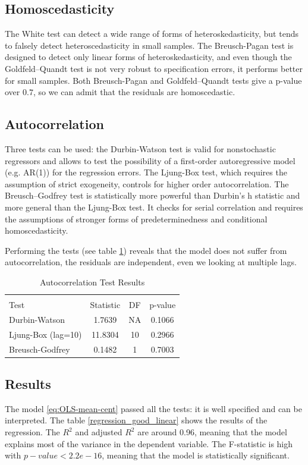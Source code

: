 \subsection{Homoscedasticity}
The White test can detect a wide range of forms of heteroskedasticity, but tends to falsely detect heteroscedasticity in small samples. The {Breusch-Pagan} test is designed to detect only linear forms of heteroskedasticity, and even though the Goldfeld–Quandt test is not very robust to specification errors, it performs better for small samples. Both Breusch-Pagan and Goldfeld–Quandt tests give a p-value over $0.7$, so we can admit that the residuals are homoscedastic.

\subsection{Autocorrelation}
Three tests can be used: the Durbin-Watson test is valid for nonstochastic regressors and allows to test the possibility of a first-order autoregressive model (e.g. AR(1)) for the regression errors. The Ljung-Box test, which requires the assumption of strict exogeneity, controls for higher order autocorrelation. 
The Breusch–Godfrey test is statistically more powerful than Durbin's h statistic and more general than the {Ljung-Box} test. It checks for serial correlation and requires the assumptions of stronger forms of predeterminedness and conditional homoscedasticity.

Performing the tests (see table \ref{autocorrelation_tests}) reveals that the model does not suffer from autocorrelation, the residuals are independent, even we looking at multiple lags.
\begin{table}[h]
    \centering
    \caption{Autocorrelation Test Results}
    \label{autocorrelation_tests}
    \begin{tabular}{lccc}
    \\[-1.8ex]\hline 
    \hline \\[-1.8ex] 
    Test & Statistic & DF & p-value \\
    \hline
    Durbin-Watson & 1.7639  & NA & 0.1066 \\
    Ljung-Box (lag=10) & 11.8304  & 10 & 0.2966 \\
    Breusch-Godfrey & 0.1482  & 1 & 0.7003 \\
    \hline
    \end{tabular}
\end{table}

\subsection{Results}
The model \eqref{eq:OLS-mean-cent} passed all the tests: it is well specified and can be interpreted. The table \ref{regression_good_linear} shows the results of the regression. The $R^2$ and adjusted $R^2$ are around 0.96, meaning that the model explains most of the variance in the dependent variable. The F-statistic is high with $p-value < 2.2e-16$, meaning that the model is statistically significant. 

